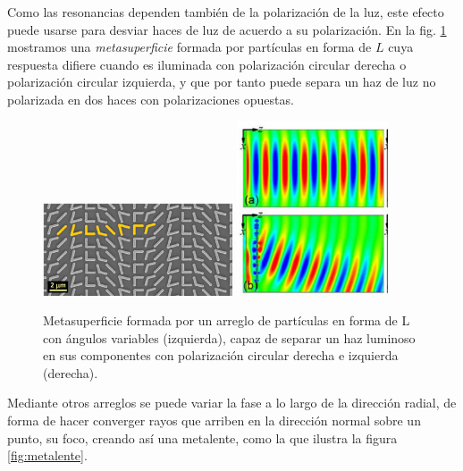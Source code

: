 \documentclass[12pt]{article}
\begin{document}
Como las resonancias dependen también de la polarización de la luz,
este efecto puede usarse para desviar haces de luz de acuerdo a su
polarización. En la fig. \ref{fig:metasup} mostramos una {\em
  metasuperficie} formada por partículas en forma de $L$ cuya
respuesta difiere cuando es iluminada con polarización circular
derecha o polarización circular izquierda, y que por tanto puede
separa un haz de luz no polarizada en dos haces con polarizaciones
opuestas.
\begin{figure}
  \centering
  \includegraphics[width=0.5\textwidth,angle=90,valign=c]{metasup1}
  \includegraphics[width=0.4\textwidth,valign=c]{metasup2a}
  \caption{Metasuperficie formada por un arreglo de partículas en
    forma de L con ángulos variables (izquierda), capaz de separar un
    haz luminoso en sus componentes con polarización circular derecha
    e izquierda (derecha).}
  \label{fig:metasup}
\end{figure}
Mediante otros arreglos se puede variar la fase a lo largo de la
dirección radial, de forma de hacer converger rayos que arriben en la
dirección normal sobre un punto, su foco, creando así una metalente,
como la que ilustra la figura \ref{fig:metalente}.
\end{document}
